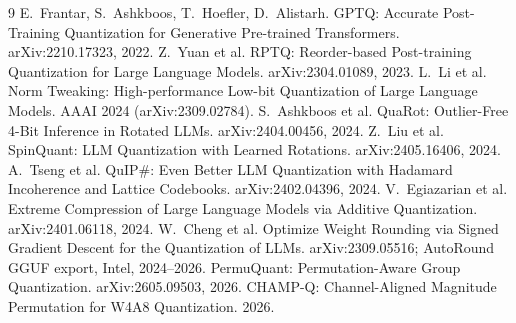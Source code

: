 \documentclass[11pt]{article}
\begin{document}
\begin{thebibliography}{9}
 E.~Frantar, S.~Ashkboos, T.~Hoefler, D.~Alistarh.
GPTQ: Accurate Post-Training Quantization for Generative Pre-trained Transformers.
arXiv:2210.17323, 2022.
 Z.~Yuan et al. RPTQ: Reorder-based Post-training Quantization for
Large Language Models. arXiv:2304.01089, 2023.
 L.~Li et al. Norm Tweaking: High-performance Low-bit
Quantization of Large Language Models. AAAI 2024 (arXiv:2309.02784).
 S.~Ashkboos et al. QuaRot: Outlier-Free 4-Bit Inference in Rotated
LLMs. arXiv:2404.00456, 2024.
 Z.~Liu et al. SpinQuant: LLM Quantization with Learned
Rotations. arXiv:2405.16406, 2024.
 A.~Tseng et al. QuIP\#: Even Better LLM Quantization with
Hadamard Incoherence and Lattice Codebooks. arXiv:2402.04396, 2024.
 V.~Egiazarian et al. Extreme Compression of Large Language Models via
Additive Quantization. arXiv:2401.06118, 2024.
 W.~Cheng et al. Optimize Weight Rounding via Signed Gradient
Descent for the Quantization of LLMs. arXiv:2309.05516; AutoRound GGUF export, Intel, 2024--2026.
 PermuQuant: Permutation-Aware Group Quantization.
arXiv:2605.09503, 2026.
 CHAMP-Q: Channel-Aligned Magnitude Permutation for W4A8
Quantization. 2026.
\end{thebibliography}
\end{document}
